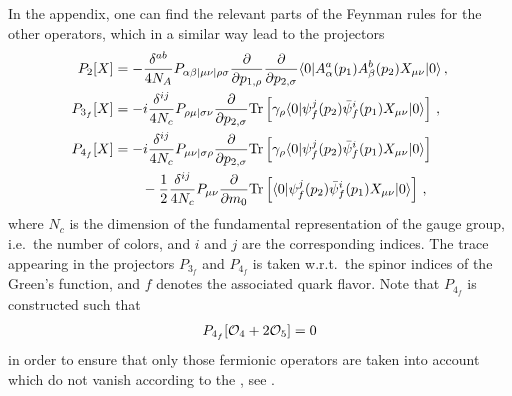 In the appendix, one can find the relevant parts of the Feynman rules
for the other operators, which in a similar way lead to the projectors
\begin{equation}
  \begin{split}
    P_2[X] &=  - \frac{\delta^{ab}}{4 N_A} P_{\alpha \beta
      | \mu \nu | \rho \sigma}
    \frac{\partial }{\partial p_{1,\rho}}
    \frac{\partial }{\partial p_{2,\sigma}}
    \langle 0 | A_\alpha^a (p_1) A_\beta^b (p_2) X_{\mu \nu} | 0
    \rangle \,,\\
    P_{3_f}[X] &= -i \frac{\delta^{i j}}{4 N_c} P_{\rho
      \mu | \sigma \nu} \frac{\partial }{\partial p_{2,\sigma}} \text{Tr} \left[
      \gamma_{\rho}
    \langle 0 | \psi_f^j (p_2) \bar{\psi}_f^i (p_1) X_{\mu \nu}
    | 0 \rangle \right]\,,\\
    P_{4_f}[X] &= -i \frac{\delta^{i j}}{4 N_c} P_{\mu \nu
      | \sigma \rho} \frac{\partial }{\partial p_{2,\sigma}} \text{Tr} \left[
      \gamma_{\rho} \langle 0 | \psi_f^j (p_2) \bar{\psi}_f^i (p_1)
      X_{\mu \nu} | 0 \rangle \right] \\
    & \qquad - \frac{1}{2} \frac{\delta^{i j}}{4 N_c} P_{\mu
      \nu} \frac{\partial }{\partial m_0} \text{Tr} \left[ \langle 0 | \psi_f^j (p_2)
      \bar{\psi}_f^i (p_1) X_{\mu \nu} | 0 \rangle \right]\,,
    \label{eq:pj}
  \end{split}
\end{equation}
where $N_c$ is the dimension of the fundamental representation of the
gauge group, i.e.\ the number of colors, and $i$ and $j$ are the corresponding indices.
The trace appearing in the projectors $P_{3_f}$ and
$P_{4_f}$ is taken w.r.t.\ the spinor indices of the Green's function,
and $f$ denotes the associated quark flavor.
Note that $P_{4_f}$ is constructed such that
\begin{equation}
  \begin{split}
    P_{4_f}[\mathcal{O}_4 + 2\mathcal{O}_5] = 0
  \end{split}
\end{equation}
in order to ensure that only those fermionic operators are taken into
account which do not vanish according to the \eom, see .

